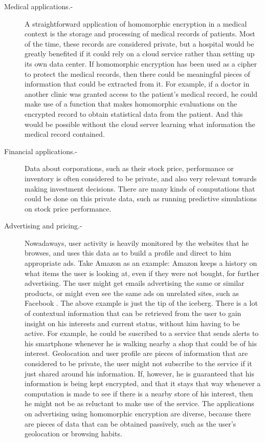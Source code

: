 \begin{description}
\item[Medical applications.-] A straightforward application of homomorphic encryption in a medical context is the storage and processing of medical records of patients. Most of the time, these records are considered private, but a hospital would be greatly benefited if it could rely on a cloud service rather than setting up its own data center. If homomorphic encryption has been used as a cipher to protect the medical records, then there could be meaningful pieces of information that could be extracted from it. For example, if a doctor in another clinic was granted access to the patient's medical record, he could make use of a function that makes homomorphic evaluations on the encrypted record to obtain statistical data from the patient. And this would be possible without the cloud server learning what information the medical record contained.
\item[Financial applications.-] Data about corporations, such as their stock price, performance or inventory is often considered to be private, and also very relevant towards making investment decisions. There are many kinds of computations that could be done on this private data, such as running predictive simulations on stock price performance. 
\item[Advertising and pricing.-] Nowadaways, user activity is heavily monitored by the websites that he browses, and uses this data as to build a profile and direct to him appropriate ads. Take Amazon as an example: Amazon keeps a history on what items the user is looking at, even if they were not bought, for further advertising. The user might get emails advertising the same or similar products, or might even see the same ads on unrelated sites, such as Facebook \cite{KimMai}. 
  The above example is just the tip of the iceberg. There is a lot of contextual information that can be retrieved from the user to gain insight on his interests and current status, without him having to be active. For example, he could be suscribed to a service that sends alerts to his smartphone whenever he is walking nearby a shop that could be of his interest. Geolocation and user profile are pieces of information that are considered to be private, the user might not subscribe to the service if it just shared around his information. If, however, he is guaranteed that his information is being kept encrypted, and that it stays that way whenever a computation is made to see if there is a nearby store of his interest, then he might not be as reluctant to make use of the service. The applications on advertising using homomorphic encryption are diverse, because there are pieces of data that can be obtained passively, such as the user's geolocation or browsing habits.

\end{description}
